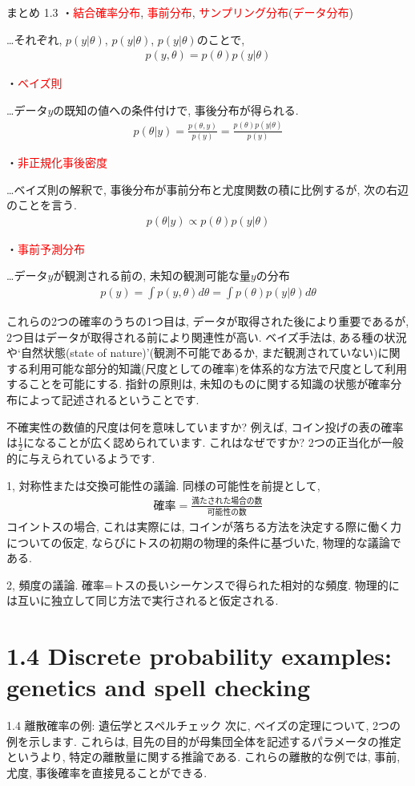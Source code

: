 \documentclass[10pt,dvipdfmx,a4]{beamer}
\newcommand{\eqn}[1]{\begin{align*}#1\end{align*}}
\newcommand{\tcr}[1]{\textcolor{red}{#1}}
\begin{document}

\begin{frame}{まとめ 1.3}
・\tcr{結合確率分布}, \tcr{事前分布}, \tcr{サンプリング分布}(\tcr{データ分布})

…それぞれ, $p(y|\theta)$, $p(y|\theta)$, $p(y|\theta)$のことで,
\eqn{p(y,\theta)=p(\theta)p(y|\theta)}

・\tcr{ベイズ則}

…データ$y$の既知の値への条件付けで, 事後分布が得られる.
\eqn{p(\theta|y)=\tfrac{p(\theta,y)}{p(y)}=\tfrac{p(\theta)p(y|\theta)}{p(y)}}

・\tcr{非正規化事後密度}

…ベイズ則の解釈で, 事後分布が事前分布と尤度関数の積に比例するが, 次の右辺のことを言う.
\eqn{p(\theta|y)\propto p(\theta)p(y|\theta)}

・\tcr{事前予測分布}

…データ$y$が観測される前の, 未知の観測可能な量$y$の分布
\eqn{p(y)=\int p(y,\theta)d\theta=\int p(\theta)p(y|\theta)d\theta}
\end{frame}


\begin{frame}
これらの2つの確率のうちの1つ目は, データが取得された後により重要であるが, 2つ目はデータが取得される前により関連性が高い.
ベイズ手法は, ある種の状況や`自然状態(state of nature)'(観測不可能であるか, まだ観測されていない)に関する利用可能な部分的知識(尺度としての確率)を体系的な方法で尺度として利用することを可能にする.
指針の原則は, 未知のものに関する知識の状態が確率分布によって記述されるということです.

不確実性の数値的尺度は何を意味していますか?
例えば, コイン投げの表の確率は$\tfrac{1}{2}$になることが広く認められています.
これはなぜですか?
2つの正当化が一般的に与えられているようです.

1, 対称性または交換可能性の議論.
同様の可能性を前提として,
\eqn{\text{確率}=\frac{\text{満たされた場合の数}}{\text{可能性の数}}}
コイントスの場合, これは実際には, コインが落ちる方法を決定する際に働く力についての仮定, ならびにトスの初期の物理的条件に基づいた, 物理的な議論である.

2, 頻度の議論.
確率=トスの長いシーケンスで得られた相対的な頻度.
物理的には互いに独立して同じ方法で実行されると仮定される.
\end{frame}

\section{1.4 Discrete probability examples: genetics and spell checking}
\begin{frame}{1.4 離散確率の例: 遺伝学とスペルチェック}
次に, ベイズの定理について, 2つの例を示します.
これらは, 目先の目的が母集団全体を記述するパラメータの推定というより, 特定の離散量に関する推論である.
これらの離散的な例では, 事前, 尤度, 事後確率を直接見ることができる.
\end{frame}
\end{document}
